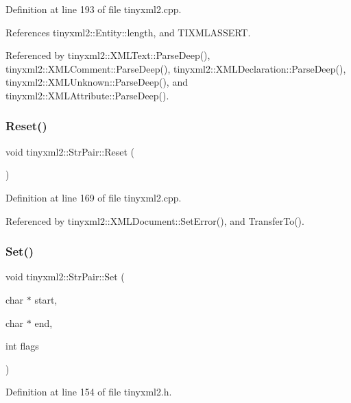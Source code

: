 Definition at line 193 of file tinyxml2.\+cpp.



References tinyxml2\+::\+Entity\+::length, and T\+I\+X\+M\+L\+A\+S\+S\+E\+RT.



Referenced by tinyxml2\+::\+X\+M\+L\+Text\+::\+Parse\+Deep(), tinyxml2\+::\+X\+M\+L\+Comment\+::\+Parse\+Deep(), tinyxml2\+::\+X\+M\+L\+Declaration\+::\+Parse\+Deep(), tinyxml2\+::\+X\+M\+L\+Unknown\+::\+Parse\+Deep(), and tinyxml2\+::\+X\+M\+L\+Attribute\+::\+Parse\+Deep().

\mbox{\label{classtinyxml2_1_1_str_pair_a80c1b3bd99bf62ae85c94a29ce537125}} 
\subsubsection{Reset()}
{\footnotesize\ttfamily void tinyxml2\+::\+Str\+Pair\+::\+Reset (\begin{DoxyParamCaption}{ }\end{DoxyParamCaption})}



Definition at line 169 of file tinyxml2.\+cpp.



Referenced by tinyxml2\+::\+X\+M\+L\+Document\+::\+Set\+Error(), and Transfer\+To().

\mbox{\label{classtinyxml2_1_1_str_pair_a4f05549373394266a1eecba26813c166}} 
\subsubsection{Set()}
{\footnotesize\ttfamily void tinyxml2\+::\+Str\+Pair\+::\+Set (\begin{DoxyParamCaption}\item[{char $\ast$}]{start,  }\item[{char $\ast$}]{end,  }\item[{int}]{flags }\end{DoxyParamCaption})\hspace{0.3cm}{\ttfamily [inline]}}



Definition at line 154 of file tinyxml2.\+h.



